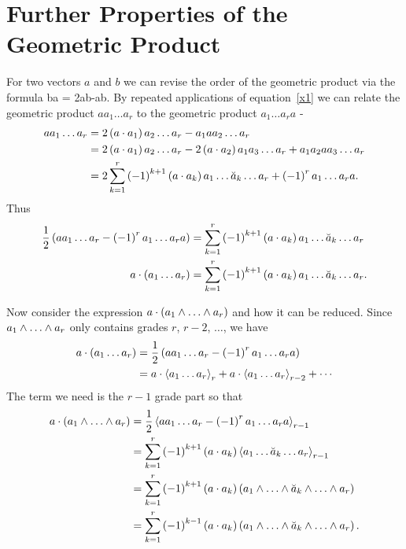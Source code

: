 
\appendix
\chapter{Further Properties of the Geometric Product}\label{Appendix_A}
For two vectors $a$ and $b$ we can revise the order of the geometric product via the formula
\be\label{x1}
	ba = 2a\cdot b-ab.
\ee
By repeated applications of equation~\ref{x1} we can relate the geometric product $aa_{1}\dots a_{r}$ to the geometric product $a_{1}\dots a_{r}a$ -
\begin{align}
	aa_{1}\dots a_{r} &= 2\left ( {a\cdot a_{1}} \right ) a_{2}\dots a_{r}-a_{1}aa_{2}\dots a_{r} \nonumber \\
	                  &= 2\left ( {a\cdot a_{1}} \right ) a_{2}\dots a_{r}-2\left ( {a\cdot a_{2}} \right ) a_{1}a_{3}\dots a_{r}+a_{1}a_{2}aa_{3}\dots a_{r} \nonumber \\
	                  &= 2\sum_{k=1}^{r}\left ( {-1} \right )^{k+1}\left ( {a\cdot a_{k}} \right ) a_{1}\dots \breve{a}_{k}\dots a_{r}+\left ( {-1} \right )^{r}a_{1}\dots a_{r}a.\label{x2}
\end{align} 
Thus
\begin{align}
	\displaystyle\frac{1}{2}\left ( {aa_{1}\dots a_{r}-\left ( {-1} \right )^{r}a_{1}\dots a_{r}a} \right ) &= \sum_{k=1}^{r}\left ( {-1} \right )^{k+1}\left ( {a\cdot a_{k}} \right ) a_{1}\dots \breve{a}_{k}\dots a_{r} \nonumber \\
	                         a\cdot\left ( {a_{1}\dots a_{r}} \right )  &= \sum_{k=1}^{r}\left ( {-1} \right )^{k+1}\left ( {a\cdot a_{k}} \right ) a_{1}\dots \breve{a}_{k}\dots a_{r}. \label{x4} 
\end{align} 

Now consider the expression $a\cdot\paren{a_{1}\W\dots\W a_{r}}$ and how it can be reduced.  Since $a_{1}\W\dots\W a_{r}$ only contains grades $r$, $r-2$, $\dots$,
we have
\begin{align}
	a\cdot\left ( {a_{1}\dots a_{r}} \right ) &= \displaystyle\frac{1}{2}\left ( {aa_{1}\dots a_{r}-\left ( {-1} \right )^{r}a_{1}\dots a_{r}a} \right ) \nonumber \\
	                               &= a\cdot\left \langle {a_{1}\dots a_{r}} \right \rangle_{r}+a\cdot\left \langle {a_{1}\dots a_{r}} \right \rangle_{r-2}+\cdots
\end{align}
The term we need is the $r-1$ grade part so that
\begin{align}
	a\cdot\paren{a_{1}\W\dots\W a_{r}} &= \half\grd{aa_{1}\dots a_{r}-\onep{r}a_{1}\dots a_{r}a}{r-1} \nonumber \\
	                                   &= \sum_{k=1}^{r}\onep{k+1}\paren{a\cdot a_{k}}\grd{a_{1}\dots \breve{a}_{k}\dots a_{r}}{r-1} \nonumber \\
	                                   &= \sum_{k=1}^{r}\onep{k+1}\paren{a\cdot a_{k}}\paren{a_{1}\W\dots \W\breve{a}_{k}\W\dots\W a_{r}} \nn \\
	                                   &= \sum_{k=1}^{r}\onep{k-1}\paren{a\cdot a_{k}}\paren{a_{1}\W\dots \W\breve{a}_{k}\W\dots\W a_{r}}. \label{eqA_5}
\end{align}

